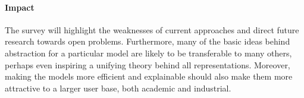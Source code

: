 \documentclass[11pt,english,twocolumn]{article}
\begin{document}
\paragraph{Impact}

The survey will highlight the weaknesses of current approaches and direct future
research towards open problems. Furthermore, many of the basic ideas behind
abstraction for a particular model are likely to be transferable to many others,
perhaps even inspiring a unifying theory behind all representations. Moreover,
making the models more efficient and explainable should also make them more
attractive to a larger user base, both academic and industrial.

\let\oldbibliography\thebibliography
\renewcommand{\thebibliography}[1]{\oldbibliography{#1}
\setlength{\itemsep}{-3pt}}


{
\scriptsize

}
\end{document}

